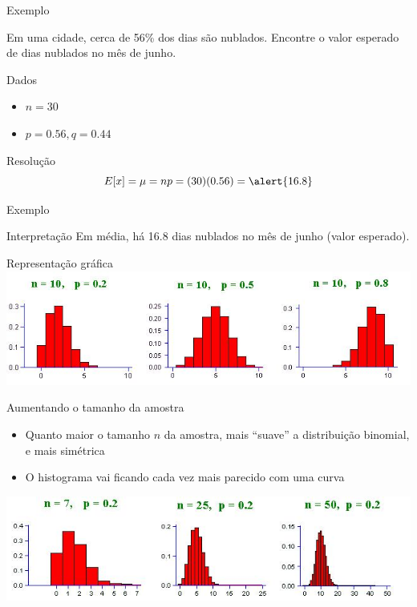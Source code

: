 \documentclass{beamer}
\begin{document}
\begin{frame}{Exemplo}
  \begin{example}
    Em uma cidade, cerca de 56\% dos dias são nublados.
    Encontre o valor esperado de dias nublados no mês de junho.
  \end{example}
  \begin{block}{Dados}
    \begin{itemize}
    \item $n = 30$
    \item $p = 0.56, q = 0.44$
    \end{itemize}
  \end{block}
  \begin{block}{Resolução}
    \begin{displaymath}
      E[x] = \mu = np = (30)(0.56) = \alert{16.8}
    \end{displaymath}
  \end{block}
\end{frame}

\begin{frame}{Exemplo}
  \begin{block}{Interpretação}
    Em média, há 16.8 dias nublados no mês de junho (valor esperado).
  \end{block}
\end{frame}

\begin{frame}{Representação gráfica}
\includegraphics[width=\textwidth]{Prob_II/binomial}
\end{frame}

\begin{frame}{Aumentando o tamanho da amostra}
  \begin{itemize}
  \item Quanto maior o tamanho $n$ da amostra, mais ``suave'' a
    distribuição binomial, e mais simétrica
  \item O histograma vai ficando cada vez mais parecido com uma curva
  \end{itemize}
  \includegraphics[width=\textwidth]{Prob_II/binomial2}

\end{frame}
\end{document}
